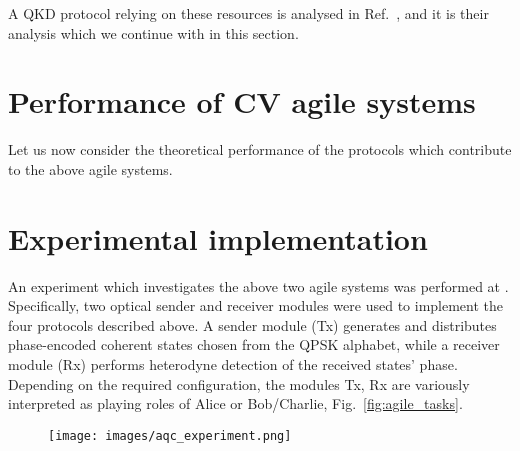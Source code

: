 A QKD protocol relying on these resources is analysed in Ref.~\cite{Papanastasiou2018}, and it is their analysis which we continue with in this section. 



\section{Performance of CV agile systems}
Let us now consider the theoretical performance of the protocols which contribute to the above agile systems. 

\section{Experimental implementation}

An experiment which investigates the above two agile systems was performed at  \cite{Richter2020}. Specifically, two optical sender and receiver modules were used to implement the four protocols described above. A sender module (Tx) generates and distributes phase-encoded coherent states chosen from the QPSK alphabet, while a receiver module (Rx) performs heterodyne detection of the received states' phase. Depending on the required configuration, the modules Tx, Rx are variously interpreted as playing roles of Alice or Bob/Charlie, Fig.~\ref{fig:agile_tasks}. 

\begin{figure}[htp]
\centering
\texttt{[image: images/aqc\_experiment.png]}
\caption{\label{fig:aqc_experiment}}
\end{figure}

